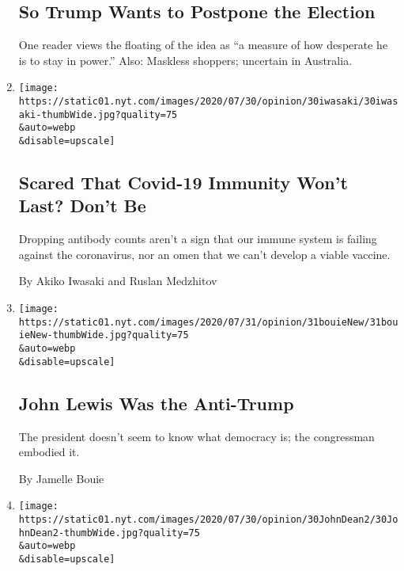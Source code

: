 \begin{enumerate}
  \hypertarget{so-trump-wants-to-postpone-the-election}{%
  \subsection{So Trump Wants to Postpone the
  Election}\label{so-trump-wants-to-postpone-the-election}}

  One reader views the floating of the idea as ``a measure of how
  desperate he is to stay in power.'' Also: Maskless shoppers; uncertain
  in Australia.
\item
  \href{/2020/07/31/opinion/coronavirus-antibodies-immunity.html}{}

  \texttt{[image: https://static01.nyt.com/images/2020/07/30/opinion/30iwasaki/30iwasaki-thumbWide.jpg?quality=75\\\&auto=webp\\\&disable=upscale]}

  \hypertarget{scared-that-covid-19-immunity-wont-last-dont-be}{%
  \subsection{Scared That Covid-19 Immunity Won't Last? Don't
  Be}\label{scared-that-covid-19-immunity-wont-last-dont-be}}

  Dropping antibody counts aren't a sign that our immune system is
  failing against the coronavirus, nor an omen that we can't develop a
  viable vaccine.

  By Akiko Iwasaki and Ruslan Medzhitov
\item
  \href{/2020/07/31/opinion/sunday/john-lewis-trump-election-2020.html}{}

  \texttt{[image: https://static01.nyt.com/images/2020/07/31/opinion/31bouieNew/31bouieNew-thumbWide.jpg?quality=75\\\&auto=webp\\\&disable=upscale]}

  \hypertarget{john-lewis-was-the-anti-trump}{%
  \subsection{John Lewis Was the
  Anti-Trump}\label{john-lewis-was-the-anti-trump}}

  The president doesn't seem to know what democracy is; the congressman
  embodied it.

  By Jamelle Bouie
\item
  \href{/2020/07/31/opinion/trump-nixon-authoritarianism.html}{}

  \texttt{[image: https://static01.nyt.com/images/2020/07/30/opinion/30JohnDean2/30JohnDean2-thumbWide.jpg?quality=75\\\&auto=webp\\\&disable=upscale]}


\end{enumerate}
